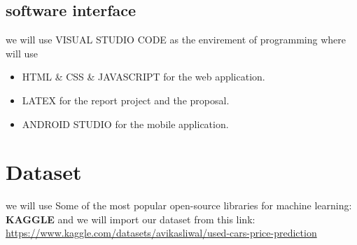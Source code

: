 \documentclass[]{report}   %
\begin{document}
\subsection{software interface}
we will use VISUAL STUDIO CODE as the envirement of programming where will use 
\begin{itemize}
  \item [\ding{228}] HTML \& CSS \& JAVASCRIPT for the web application.\\ 
  \item [\ding{228}]  LATEX for the report project and the proposal.\\
  \item [\ding{228}]  ANDROID STUDIO for the mobile application.\\
\end{itemize}
  \section{Dataset}         %
  we will use Some of the most popular open-source libraries for machine learning:
\textbf{KAGGLE} and we will import our dataset from this link: \url{https://www.kaggle.com/datasets/avikasliwal/used-cars-price-prediction}
\end{document}
